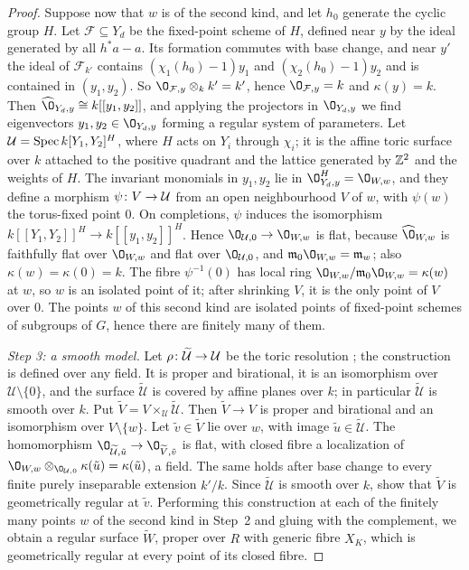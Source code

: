 \begin{proof}
Suppose now that $w$ is of the second kind, and let $h_0$ generate the cyclic group $H$.
Let $\mathcal F\subseteq Y_d$ be the fixed-point scheme of $H$, defined near $y$ by the ideal generated by all $h^*a-a$.
Its formation commutes with base change, and near $y'$ the ideal of $\mathcal F_{k'}$ contains $(\chi_1(h_0)-1)y_1$ and $(\chi_2(h_0)-1)y_2$ and is contained in $(y_1,y_2)$.
So $\O_{\mathcal F,y}\otimes_kk' = k'$, hence $\O_{\mathcal F,y} = k$ and $\kappa(y) = k$.
Then $\widehat\O_{Y_d,y}\cong k[[y_1,y_2]]$, and applying the projectors in $\O_{Y_d,y}$ we find eigenvectors $y_1,y_2\in\O_{Y_d,y}$ forming a regular system of parameters.
Let $\mathcal U = \operatorname{Spec} k[Y_1,Y_2]^H$, where $H$ acts on $Y_i$ through $\chi_i$; it is the affine toric surface over $k$ attached to the positive quadrant and the lattice generated by $\mathbb{Z}^2$ and the weights of $H$.
The invariant monomials in $y_1,y_2$ lie in $\O_{Y_d,y}^H = \O_{W,w}$, and they define a morphism $\psi\colon V\to\mathcal U$ from an open neighbourhood $V$ of $w$, with $\psi(w)$ the torus-fixed point $0$.
On completions, $\psi$ induces the isomorphism $k[[Y_1,Y_2]]^H\to k[[y_1,y_2]]^H$.
Hence $\O_{\mathcal U,0}\to\O_{W,w}$ is flat, because $\widehat\O_{W,w}$ is faithfully flat over $\O_{W,w}$ and flat over $\O_{\mathcal U,0}$, and $\mathfrak m_0\O_{W,w} = \mathfrak m_w$; also $\kappa(w) = \kappa(0) = k$.
The fibre $\psi^{-1}(0)$ has local ring $\O_{W,w}/\mathfrak m_0\O_{W,w} = \kappa(w)$ at $w$, so $w$ is an isolated point of it; after shrinking $V$, it is the only point of $V$ over $0$.
The points $w$ of this second kind are isolated points of fixed-point schemes of subgroups of $G$, hence there are finitely many of them.

\emph{Step 3: a smooth model.}
Let $\rho\colon\widetilde{\mathcal U}\to\mathcal U$ be the toric resolution \cite[Section~2.6]{Ful93}; the construction is defined over any field.
It is proper and birational, it is an isomorphism over $\mathcal U\setminus\{0\}$, and the surface $\widetilde{\mathcal U}$ is covered by affine planes over $k$; in particular $\widetilde{\mathcal U}$ is smooth over $k$.
Put $\widetilde V = V\times_{\mathcal U}\widetilde{\mathcal U}$.
Then $\widetilde V\to V$ is proper and birational and an isomorphism over $V\setminus\{w\}$.
Let $\tilde v\in\widetilde V$ lie over $w$, with image $\tilde u\in\widetilde{\mathcal U}$.
The homomorphism $\O_{\widetilde{\mathcal U},\tilde u}\to\O_{\widetilde V,\tilde v}$ is flat, with closed fibre a localization of $\O_{W,w}\otimes_{\O_{\mathcal U,0}}\kappa(\tilde u) = \kappa(\tilde u)$, a field.
The same holds after base change to every finite purely inseparable extension $k'/k$.
Since $\widetilde{\mathcal U}$ is smooth over $k$, \cite[Tags~ and ]{Stacks} show that $\widetilde V$ is geometrically regular at $\tilde v$.
Performing this construction at each of the finitely many points $w$ of the second kind in Step~2 and gluing with the complement, we obtain a regular surface $\widetilde W$, proper over $R$ with generic fibre $X_K$, which is geometrically regular at every point of its closed fibre.


\end{proof}
